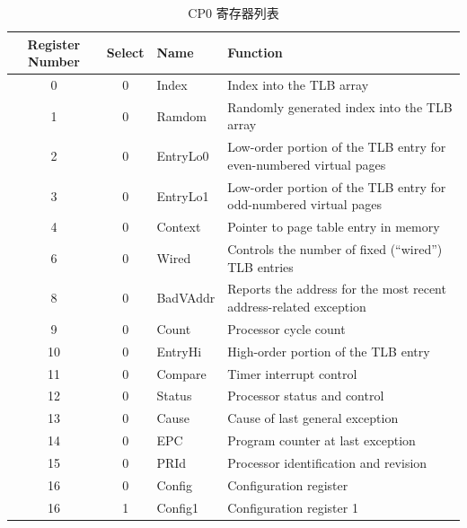 \documentclass[blue,normal,cn,hide]{elegantbook}
\begin{document}
\begin{table}
    \renewcommand\arraystretch{1.25}
    \centering
    \begin{tabular}{cclm{}}
        \toprule 
        \rowcolor{black!20} \textbf{Register Number} & \textbf{Select} & \textbf{Name} & \textbf{Function} \\
        \midrule
        \rowcolor{green!20} 0 & 0 & Index & Index into the TLB array \\
        \rowcolor{green!20} 1 & 0 & Ramdom & Randomly generated index into the TLB array \\
        \rowcolor{green!20} 2 & 0 & EntryLo0 & Low-order portion of the TLB entry for
        even-numbered virtual pages \\
        \rowcolor{green!20} 3 & 0 & EntryLo1 & Low-order portion of the TLB entry for
        odd-numbered virtual pages \\
        \rowcolor{green!20} 4 & 0 & Context & Pointer to page table entry in memory \\
        \rowcolor{green!20} 6 & 0 & Wired & Controls the number of fixed (“wired”) TLB
        entries \\
        \rowcolor{cyan!20} 8 & 0 & BadVAddr & Reports the address for the most recent
        address-related exception \\
        \rowcolor{cyan!20} 9 & 0 & Count & Processor cycle count \\
        \rowcolor{green!20} 10 & 0 & EntryHi & High-order portion of the TLB entry \\
        \rowcolor{cyan!20} 11 & 0 & Compare & Timer interrupt control \\
        \rowcolor{cyan!20} 12 & 0 & Status &  Processor status and control \\
        \rowcolor{cyan!20} 13 & 0 & Cause & Cause of last general exception \\
        \rowcolor{cyan!20} 14 & 0 & EPC & Program counter at last exception \\
        \rowcolor{green!20} 15 & 0 & PRId & Processor identification and revision \\
        \rowcolor{green!20} 16 & 0 & Config &  Configuration register \\
        \rowcolor{green!20} 16 & 1 & Config1 & Configuration register 1 \\

        \bottomrule
    \end{tabular}
    \caption{CP0 寄存器列表}
    \label{tab:SiriusCP0}
\end{table}


\end{document}
